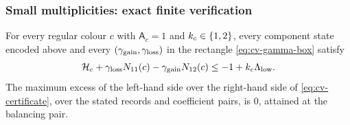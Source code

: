 \subsubsection{Small multiplicities: exact finite verification}

\begin{lemma}\label{lem:cv-certificate}
For every regular colour \(c\) with
\(\mathsf A_c=1\) and \(k_c\in\left\{1,2\right\}\), every component state encoded
above and every $(\gamma_{\rm gain},\gamma_{\rm loss})$ in the rectangle
\eqref{eq:cv-gamma-box}
satisfy
\begin{equation}\label{eq:cv-certificate}
\mathcal H_c+\gamma_{\rm loss}N_{11}(c)
       -\gamma_{\rm gain}N_{12}(c)
 \le-1+k_c\Lambda_{\rm low}.
\end{equation}
The maximum excess of the left-hand side over the right-hand side of
\eqref{eq:cv-certificate}, over the stated records and coefficient pairs,
is $0$, attained at the balancing pair.
\end{lemma}

